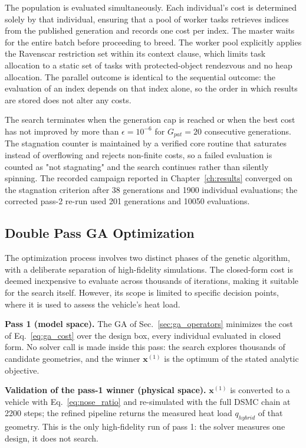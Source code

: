 The population is evaluated simultaneously. Each individual's cost is determined solely by that individual, ensuring that a pool of worker tasks retrieves indices from the published generation and records one cost per index. The master waits for the entire batch before proceeding to breed. The worker pool explicitly applies the Ravenscar restriction set within its context clause, which limits task allocation to a static set of tasks with protected-object rendezvous and no heap allocation. The parallel outcome is identical to the sequential outcome: the evaluation of an index depends on that index alone, so the order in which results are stored does not alter any costs.

The search terminates when the generation cap is reached or when the best cost has not improved by more than $\epsilon = 10^{-6}$ for $G_{pat} = 20$ consecutive generations. The stagnation counter is maintained by a verified core routine that saturates instead of overflowing and rejects non-finite costs, so a failed evaluation is counted as "not stagnating" and the search continues rather than silently spinning. The recorded campaign reported in Chapter~\ref{ch:results} converged on the stagnation criterion after 38 generations and 1900 individual evaluations; the corrected pass-2 re-run used 201 generations and 10050 evaluations.

\subsection{Double Pass GA Optimization}
\label{sec:double_pass_ga}

The optimization process involves two distinct phases of the genetic algorithm, with a deliberate separation of high-fidelity simulations. The closed-form cost is deemed inexpensive to evaluate across thousands of iterations, making it suitable for the search itself. However, its scope is limited to specific decision points, where it is used to assess the vehicle's heat load.

\textbf{Pass 1 (model space).} The GA of Sec.~\ref{sec:ga_operators} minimizes the cost of Eq.~\eqref{eq:ga_cost} over the design box, every individual evaluated in closed form. No solver call is made inside this pass: the search explores thousands of candidate geometries, and the winner $\mathbf{x}^{(1)}$ is the optimum of the stated analytic objective.

\textbf{Validation of the pass-1 winner (physical space).} $\mathbf{x}^{(1)}$ is converted to a vehicle with Eq.~\eqref{eq:nose_ratio} and re-simulated with the full DSMC chain at 2200 steps; the refined pipeline returns the measured heat load $q_{hybrid}$ of that geometry. This is the only high-fidelity run of pass 1: the solver measures one design, it does not search.

